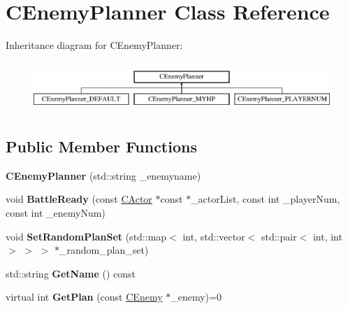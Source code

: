 \hypertarget{class_c_enemy_planner}{}\section{C\+Enemy\+Planner Class Reference}
\label{class_c_enemy_planner}
Inheritance diagram for C\+Enemy\+Planner\+:\begin{figure}[H]
\begin{center}
\leavevmode
\includegraphics[height=1.914530cm]{class_c_enemy_planner}
\end{center}
\end{figure}
\subsection*{Public Member Functions}
\begin{DoxyCompactItemize}
\item 
{\bfseries C\+Enemy\+Planner} (std\+::string \+\_\+enemyname)\hypertarget{class_c_enemy_planner_aa37dda7cb289c53cfabd45b5992c57fa}{}\label{class_c_enemy_planner_aa37dda7cb289c53cfabd45b5992c57fa}

\item 
void {\bfseries Battle\+Ready} (const \hyperlink{class_c_actor}{C\+Actor} $\ast$const $\ast$\+\_\+actor\+List, const int \+\_\+player\+Num, const int \+\_\+enemy\+Num)\hypertarget{class_c_enemy_planner_a52c6974a32442debbaedebf14a45458b}{}\label{class_c_enemy_planner_a52c6974a32442debbaedebf14a45458b}

\item 
void {\bfseries Set\+Random\+Plan\+Set} (std\+::map$<$ int, std\+::vector$<$ std\+::pair$<$ int, int $>$ $>$ $>$ $\ast$\+\_\+random\+\_\+plan\+\_\+set)\hypertarget{class_c_enemy_planner_af89bcad6c1491139c2c3faf81f84f38a}{}\label{class_c_enemy_planner_af89bcad6c1491139c2c3faf81f84f38a}

\item 
std\+::string {\bfseries Get\+Name} () const \hypertarget{class_c_enemy_planner_a42d9f3358032f6cb1cd9804776cfc26e}{}\label{class_c_enemy_planner_a42d9f3358032f6cb1cd9804776cfc26e}

\item 
virtual int {\bfseries Get\+Plan} (const \hyperlink{class_c_enemy}{C\+Enemy} $\ast$\+\_\+enemy)=0\hypertarget{class_c_enemy_planner_ab49948ff6784b7b21d9a828f560daa40}{}\label{class_c_enemy_planner_ab49948ff6784b7b21d9a828f560daa40}

\end{DoxyCompactItemize}
